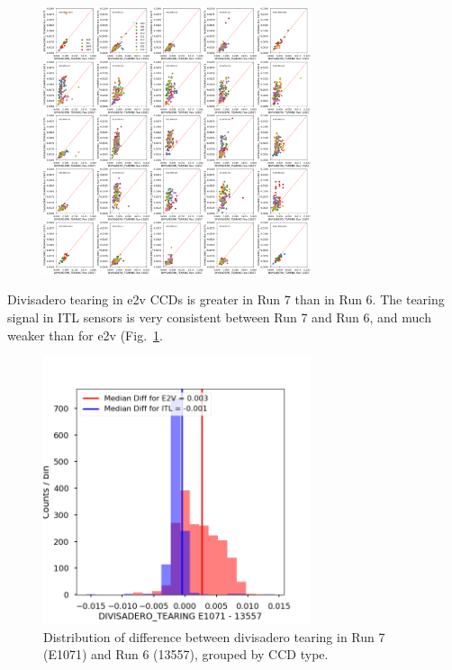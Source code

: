 \begin{figure}[H]
\begin{centering}
\includegraphics[width=0.7\textwidth]{sections/figures/baselineCharacterization/13557_E1071_DIVISADERO_TEARING.png}
\end{centering}
\end{figure}

Divisadero tearing in e2v CCDs is greater in Run 7 than in Run 6. The tearing signal in ITL
sensors is very consistent between Run 7 and Run 6, and much weaker than for e2v (Fig.~\ref{fig:divisadero}.

\begin{figure}[H]
\begin{centering}
\includegraphics[width=0.7\textwidth]{sections/figures/baselineCharacterization/DIVISADERO_TEARING_13557_E1071_diff.png}
\caption{Distribution of difference between divisadero tearing in Run 7 (E1071) and Run 6 (13557), grouped by CCD type.}
\label{fig:divisadero}
\end{centering}
\end{figure}

